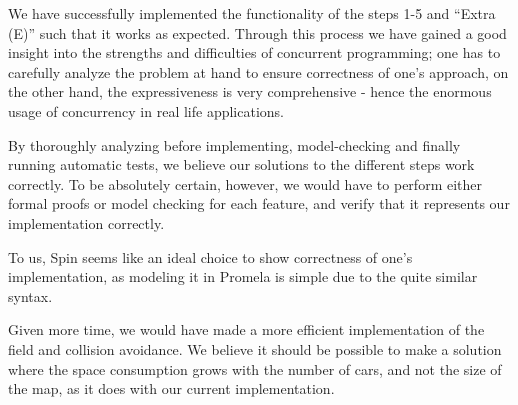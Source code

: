 
We have successfully implemented the functionality of the steps 1-5
and ``Extra (E)'' such that it works as expected. Through this process
we have gained a good insight into the strengths and difficulties of
concurrent programming; one has to carefully analyze the problem at
hand to ensure correctness of one's approach, on the other hand, the
expressiveness is very comprehensive - hence the enormous usage of
concurrency in real life applications.

By thoroughly analyzing before implementing, model-checking and
finally running automatic tests, we believe our solutions to the
different steps work correctly. To be absolutely certain, however, we
would have to perform either formal proofs or model checking for each
feature, and verify that it represents our implementation correctly.

To us, Spin seems like an ideal choice to show correctness of one's
implementation, as modeling it in Promela is simple due to the quite
similar syntax.

Given more time, we would have made a more efficient implementation of
the field and collision avoidance. We believe it should be possible to
make a solution where the space consumption grows with the number of
cars, and not the size of the map, as it does with our current
implementation.
